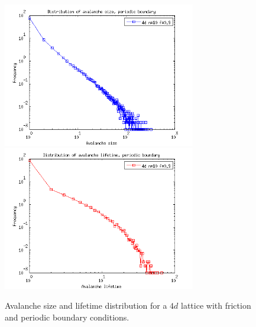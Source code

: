 \begin{figure}
\begin{center}
\includegraphics[width=0.75\textwidth]{results/4spf.png} \\
\includegraphics[width=0.75\textwidth]{results/4tpf.png} \\
\caption{Avalanche size and lifetime distribution for a $4d$ lattice with friction and periodic boundary conditions. }
\label{dspf4}
\end{center}
\end{figure}



